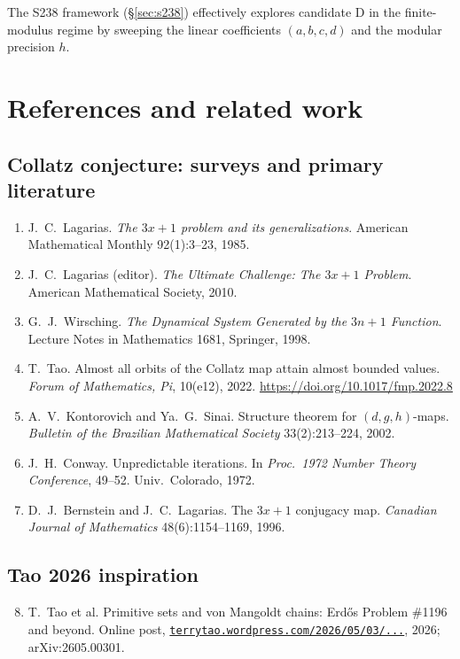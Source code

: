 \documentclass[11pt,a4paper]{article}
\theoremstyle{plain}
\theoremstyle{definition}
\begin{document}
The S238 framework (\S\ref{sec:s238}) effectively explores
candidate D in the finite-modulus regime by sweeping the linear
coefficients $(a, b, c, d)$ and the modular precision $h$.

\section{References and related work}\label{app:references}

\subsection*{Collatz conjecture: surveys and primary literature}

\begin{enumerate}
\item J.~C.~Lagarias. \emph{The $3x+1$ problem and its generalizations}.
       American Mathematical Monthly 92(1):3--23, 1985.
\item J.~C.~Lagarias (editor). \emph{The Ultimate Challenge: The $3x+1$ Problem}.
       American Mathematical Society, 2010.
\item G.~J.~Wirsching. \emph{The Dynamical System Generated by the $3n+1$ Function}.
       Lecture Notes in Mathematics 1681, Springer, 1998.
\item T.~Tao. Almost all orbits of the Collatz map attain almost
       bounded values. \emph{Forum of Mathematics, Pi}, 10(e12), 2022.
       \url{https://doi.org/10.1017/fmp.2022.8}
\item A.~V.~Kontorovich and Ya.~G.~Sinai. Structure theorem for
       $(d, g, h)$-maps. \emph{Bulletin of the Brazilian Mathematical Society}
       33(2):213--224, 2002.
\item J.~H.~Conway. Unpredictable iterations. In \emph{Proc.\ 1972 Number
       Theory Conference}, 49--52. Univ.\ Colorado, 1972.
\item D.~J.~Bernstein and J.~C.~Lagarias. The $3x+1$ conjugacy map.
       \emph{Canadian Journal of Mathematics} 48(6):1154--1169, 1996.
\end{enumerate}

\subsection*{Tao 2026 inspiration}

\begin{enumerate}
\setcounter{enumi}{7}
\item T.~Tao et al. Primitive sets and von Mangoldt chains: Erdős
       Problem \#1196 and beyond.
       Online post,
       \href{https://terrytao.wordpress.com/2026/05/03/primitive-sets-and-von-mangoldt-chains-erdos-problem-1196-and-beyond/}%
            {\texttt{terrytao.wordpress.com/2026/05/03/...}},
       2026; arXiv:2605.00301.
\end{enumerate}
\end{document}
